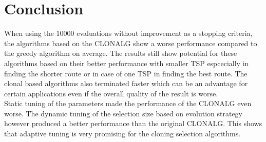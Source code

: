 \chapter{Conclusion}
\label{chap:con}
When using the 10000 evaluations without improvement as a stopping criteria, the algorithms based on the CLONALG show a worse performance compared to the greedy algorithm on average. The results still show potential for these algorithms based on their better performance with smaller TSP espcecially in finding the shorter route or in case of one TSP in finding the best route. The clonal based algorithms also terminated faster which can be an advantage for certain applications even if the overall quality of the result is worse.\\
Static tuning of the parameters made the performance of the CLONALG even worse. The dynamic tuning of the selection size based on evolution strategy however produced a better performance than the original CLONALG. This shows that adaptive tuning is very promising for the cloning selection algorithms.